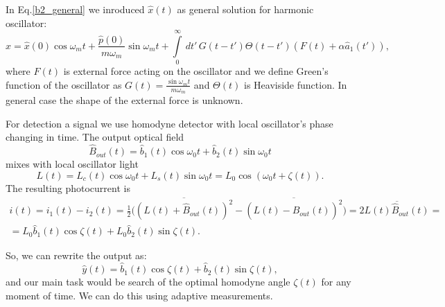 In Eq.\ref{b2_general} we inroduced $\hat{x}(t)$ as general solution for harmonic oscillator: 
\begin{equation}\label{sol_osc}
  \hat{x} = \hat{x}(0) \cos \omega_m t+ \frac{\hat{p}(0)}{m \omega_m} \sin \omega_m t + \int\limits_0^\infty \, dt' \, G(t-t')\Theta(t-t')(F(t)+\alpha \hat{a}_1(t')),
\end{equation}
where $F(t)$ is external force acting on the oscillator and we define Green's function of the oscillator as $G(t)=\frac{\sin \omega_m t}{m \omega_m}$ and $\Theta(t)$ is Heaviside function.
In general case the shape of the external force is unknown.

For detection a signal we use homodyne detector with local oscillator's phase changing in time. The output optical field
\begin{equation}
 \hat{B}_{out}(t) = \hat{b}_1(t)\cos \omega_0 t +  \hat{b}_2(t) \sin \omega_0 t
\end{equation}
mixes with local oscillator light
\begin{equation}
 L(t)=L_c(t)\cos \omega_0 t + L_s (t) \sin \omega_0 t = L_0 \cos (\omega_0 t + \zeta(t)).
\end{equation}
The resulting photocurrent is
\begin{multline}
 i(t) = i_1(t)-i_2(t) = \frac{1}{2}\bigl( \overline{(L(t)+\hat{B}_{out}(t))^2}- \overline{(L(t)-\hat{B}_{out}(t))^2}\bigr) = 2 \overline{L(t)\hat{B}_{out}(t)} =\\
=L_0 \hat{b}_1(t)\cos \zeta(t) +  L_0 \hat{b}_2(t) \sin \zeta(t).
\end{multline}

So, we can rewrite the output as:
\begin{equation}\label{gen_y}
 \hat{y}(t) = \hat{b}_1(t)\cos \zeta(t) +  \hat{b}_2(t) \sin \zeta(t),
\end{equation}
and our main task would be search of the optimal homodyne angle $\zeta(t)$ for any moment of time. We can do this using adaptive measurements.

